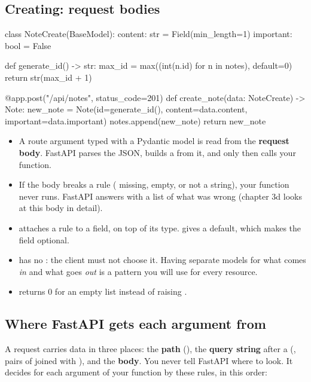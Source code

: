 \subsection{Creating: request bodies}

\begin{py}
class NoteCreate(BaseModel):
	content: str = Field(min_length=1)
	important: bool = False


def generate_id() -> str:
	max_id = max((int(n.id) for n in notes), default=0)
	return str(max_id + 1)


@app.post("/api/notes", status_code=201)
def create_note(data: NoteCreate) -> Note:
	new_note = Note(id=generate_id(), content=data.content, important=data.important)
	notes.append(new_note)
	return new_note
\end{py}

\begin{itemize}
\item A route argument typed with a Pydantic model is read from the \textbf{request body}. FastAPI parses the JSON, builds a  from it, and only then calls your function.
\item If the body breaks a rule ( missing, empty, or not a string), your function never runs. FastAPI answers  with a list of what was wrong (chapter 3d looks at this body in detail).
\item {} attaches a rule to a field, on top of its type.  gives a default, which makes the field optional.
\item {} has no : the client must not choose it. Having separate models for what comes \emph{in} and what goes \emph{out} is a pattern you will use for every resource.
\item {} returns 0 for an empty list instead of raising .
\end{itemize}

\subsection{Where FastAPI gets each argument from}

A request carries data in three places: the \textbf{path} (), the \textbf{query string} after a  (, pairs of  joined with \cd{&}), and the \textbf{body}. You never tell FastAPI where to look. It decides for each argument of your function by these rules, in this order:

